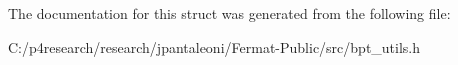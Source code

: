 The documentation for this struct was generated from the following file\+:\begin{DoxyCompactItemize}
\item 
C\+:/p4research/research/jpantaleoni/\+Fermat-\/\+Public/src/bpt\+\_\+utils.\+h\end{DoxyCompactItemize}
